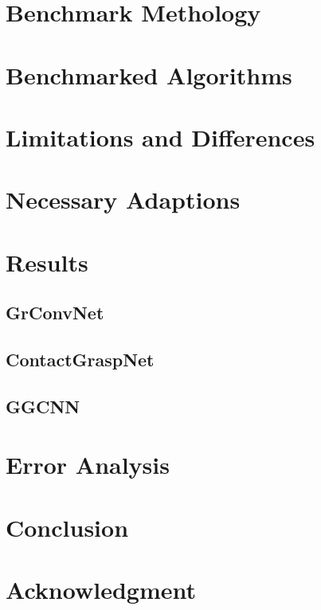 \documentclass[conference]{IEEEtran}
\begin{document}
\section{Benchmark Methology}


\section{Benchmarked Algorithms}


\section{Limitations and Differences}



\section{Necessary Adaptions}


\section{Results}
\subsection{GrConvNet}
\subsection{ContactGraspNet}
\subsection{GGCNN}

\section{Error Analysis}


\section{Conclusion}
% 


\section*{Acknowledgment}
% 




\end{document}
